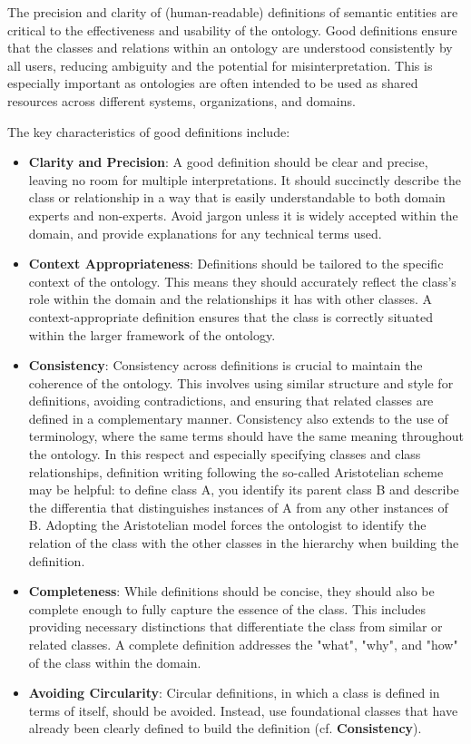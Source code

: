 The precision and clarity of (human-readable) definitions of semantic entities are critical to the effectiveness and usability of the ontology. Good definitions ensure that the classes and relations within an ontology are understood consistently by all users, reducing ambiguity and the potential for misinterpretation. This is especially important as ontologies are often intended to be used as shared resources across different systems, organizations, and domains.

The key characteristics of good definitions include:
\begin{itemize}
    \item \textbf{Clarity and Precision}: A good definition should be clear and precise, leaving no room for multiple interpretations. It should succinctly describe the class or relationship in a way that is easily understandable to both domain experts and non-experts. Avoid jargon unless it is widely accepted within the domain, and provide explanations for any technical terms used.
    \item \textbf{Context Appropriateness}: Definitions should be tailored to the specific context of the ontology. This means they should accurately reflect the class's role within the domain and the relationships it has with other classes. A context-appropriate definition ensures that the class is correctly situated within the larger framework of the ontology.
    \item \textbf{Consistency}: Consistency across definitions is crucial to maintain the coherence of the ontology. This involves using similar structure and style for definitions, avoiding contradictions, and ensuring that related classes are defined in a complementary manner. Consistency also extends to the use of terminology, where the same terms should have the same meaning throughout the ontology. In this respect and especially specifying classes and class relationships, definition writing following the so-called Aristotelian scheme may be helpful: to define class A, you identify its parent class B and describe the differentia that distinguishes instances of A from any other instances of B. Adopting the Aristotelian model forces the ontologist to identify the relation of the class with the other classes in the hierarchy when building the definition.
    \item \textbf{Completeness}: While definitions should be concise, they should also be complete enough to fully capture the essence of the class. This includes providing necessary distinctions that differentiate the class from similar or related classes. A complete definition addresses the "what", "why", and "how" of the class within the domain.
    \item \textbf{Avoiding Circularity}: Circular definitions, in which a class is defined in terms of itself, should be avoided. Instead, use foundational classes that have already been clearly defined to build the definition (cf. \textbf{Consistency}).
\end{itemize}

